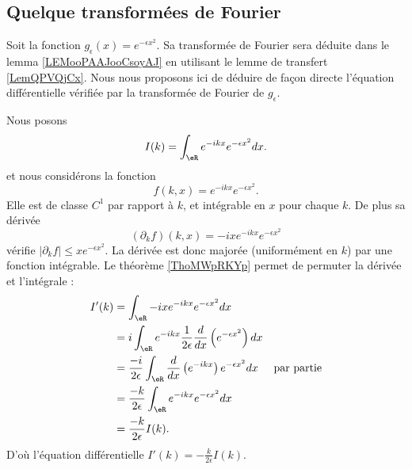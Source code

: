 \subsection{Quelque transformées de Fourier}

\begin{example} \label{EXooLMXKooFcAZGR}
    Soit la fonction \( g_{\epsilon}(x)= e^{-\epsilon x^2}\). Sa transformée de Fourier sera déduite dans le lemma \ref{LEMooPAAJooCsoyAJ} en utilisant le lemme de transfert \ref{LemQPVQjCx}. Nous nous proposons ici de déduire de façon directe l'équation différentielle vérifiée par la transformée de Fourier de \( g_{\epsilon}\).

    Nous posons
    \begin{equation}
        I(k)=\int_{\eR} e^{-ikx} e^{-\epsilon x^2}dx.
    \end{equation}
    et nous considérons la fonction
    \begin{equation}
        f(k,x)= e^{-ikx} e^{-\epsilon x^2}.
    \end{equation}
    Elle est de classe \( C^1\) par rapport à \( k\), et intégrable en \( x\) pour chaque \( k\). De plus sa dérivée
    \begin{equation}
        (\partial_k f)(k,x)=-ix e^{-ikx} e^{-\epsilon x^2}
    \end{equation}
    vérifie \( | \partial_kf |\leq x e^{-\epsilon x^2}\). La dérivée est donc majorée (uniformément en \( k\)) par une fonction intégrable. Le théorème \ref{ThoMWpRKYp} permet de permuter la dérivée et l'intégrale :
    \begin{subequations}
        \begin{align}
            I'(k)&=\int_{\eR}-ix e^{-ikx} e^{-\epsilon x^2}dx\\
            &=i\int_{\eR} e^{-ikx}\frac{1}{ 2\epsilon } \frac{ d  }{ dx }\left(  e^{-\epsilon x^2} \right)dx\\
            &=\frac{ -i }{ 2\epsilon }\int_{\eR}\frac{ d }{ dx }\left(  e^{-ikx} \right) e^{-\epsilon x^2}dx     &\text{par partie}\\
            &=\frac{ -k }{ 2\epsilon }\int_{\eR} e^{-ikx} e^{-\epsilon x^2}dx\\
            &=\frac{ -k }{ 2\epsilon }I(k).
        \end{align}
    \end{subequations}
    D'où l'équation différentielle \( I'(k)=-\frac{ k }{ 2\epsilon }I(k)\).
\end{example}

